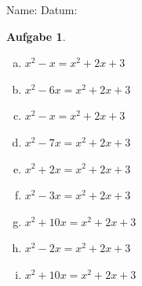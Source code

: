 \documentclass[12pt,fleqn]{article}
\theoremstyle{aufg}
\newtheorem{aufgabe}{Aufgabe}
\theoremstyle{bsp}
\begin{document}
 
    \begin{flushleft}
Name: \hspace{12cm} Datum:\begin{aufgabe} ~ \\ 
\begin{multicols}{3} 
\begin{enumerate}[a)] 
\item 
$x^{2} - x = x^{2} + 2 x + 3$
\item 
$x^{2} - 6 x = x^{2} + 2 x + 3$
\item 
$x^{2} - x = x^{2} + 2 x + 3$
\item 
$x^{2} - 7 x = x^{2} + 2 x + 3$
\item 
$x^{2} + 2 x = x^{2} + 2 x + 3$
\item 
$x^{2} - 3 x = x^{2} + 2 x + 3$
\item 
$x^{2} + 10 x = x^{2} + 2 x + 3$
\item 
$x^{2} - 2 x = x^{2} + 2 x + 3$
\item 
$x^{2} + 10 x = x^{2} + 2 x + 3$
\end{enumerate} 
\end{multicols} 
\end{aufgabe} 
\end{flushleft} 
    
\end{document}
